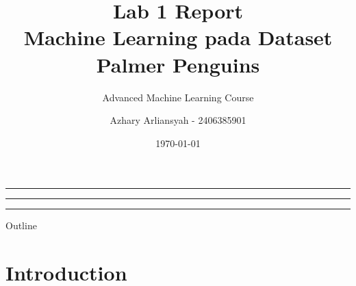 \documentclass[aspectratio=169]{beamer}
\title{\Large\textbf{Lab 1 Report} \\ Machine Learning pada Dataset Palmer Penguins}
\subtitle{Advanced Machine Learning Course}
\author{Azhary Arliansyah - 2406385901}
\institute{Magister Ilmu Komputer \\ Universitas Indonesia}
\date{\today}
\begin{document}
\begin{frame}[plain]
    \vspace{5mm}
    {\Huge\bfseries\inserttitle\par}
    \vspace{3mm}
    {\large\color{gray}\insertsubtitle\par}
    \vspace{8mm}
    {\large\insertauthor\par}
    {\normalsize\insertinstitute\par}
    \vfill
    
    \begin{beamercolorbox}[wd=\paperwidth,ht=0.5cm,dp=0cm]{}
        \hspace{0cm}\textcolor{AWSOrange}{\rule{3cm}{0.3cm}}
        \textcolor{AWSBlue}{\rule{3cm}{0.3cm}}
        \textcolor{AWSGreen}{\rule{3cm}{0.3cm}}
    \end{beamercolorbox}
\end{frame}

\begin{frame}{Outline}
    \tableofcontents
\end{frame}

\section{Introduction}
\end{document}
